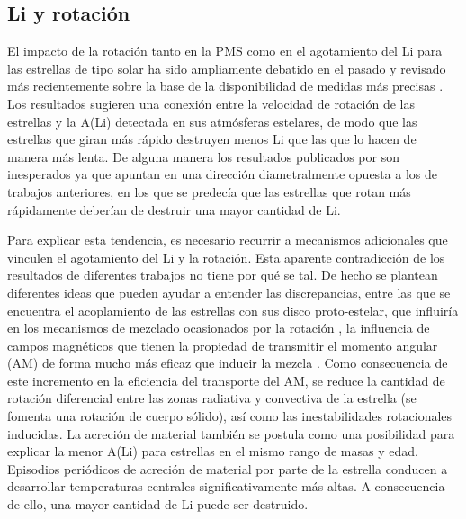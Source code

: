 \subsection{Li y rotación}
El impacto de la rotación tanto en la PMS como en el agotamiento del Li para las estrellas de tipo solar ha sido ampliamente debatido en el pasado \cite{Pinsonneault1997,Jeffries2004,Somers2014} y revisado más recientemente sobre la base de la disponibilidad de medidas más precisas \cite{Bouvier2016}. Los resultados sugieren una conexión entre la velocidad de rotación de las estrellas y la A(Li) detectada en sus atmósferas estelares, de modo que las estrellas que giran más rápido destruyen menos Li que las que lo hacen de manera más lenta. De alguna manera los resultados publicados por \cite{Bouvier2016} son inesperados ya que apuntan en una dirección diametralmente opuesta a los de trabajos anteriores, en los que se predecía que las estrellas que rotan más rápidamente deberían de destruir una mayor cantidad de Li.\par 

Para explicar esta tendencia, es necesario recurrir a mecanismos adicionales que vinculen el agotamiento del Li y la rotación. Esta aparente contradicción de los resultados de diferentes trabajos no tiene por qué se tal. De hecho se plantean diferentes ideas que pueden ayudar a entender las discrepancias, entre las que se encuentra el acoplamiento de las estrellas con sus disco proto-estelar, que influiría en los mecanismos de mezclado ocasionados por la rotación \cite{Bouvier2008, Eggenberger2012}, la influencia de campos magnéticos \cite{Eggenberger2009} que tienen la propiedad de transmitir el momento angular (AM) de forma mucho más eficaz que inducir la mezcla \cite{Denissenkov2007}. Como consecuencia de este incremento en la eficiencia del transporte del AM, se reduce la cantidad de rotación diferencial entre las zonas radiativa y convectiva de la estrella (se fomenta una rotación de cuerpo sólido), así como las inestabilidades rotacionales inducidas. La acreción de material \cite{Baraffe2010} también se postula como una posibilidad para explicar la menor A(Li) para estrellas en el mismo rango de masas y edad. Episodios periódicos de acreción de material por parte de la estrella conducen a desarrollar temperaturas centrales significativamente más altas. A consecuencia de ello, una mayor cantidad de Li puede ser destruido.\par


